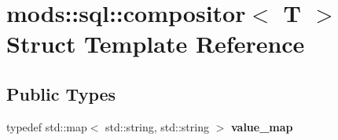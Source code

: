 \hypertarget{structmods_1_1sql_1_1compositor}{}\section{mods\+:\+:sql\+:\+:compositor$<$ T $>$ Struct Template Reference}
\label{structmods_1_1sql_1_1compositor}
\subsection*{Public Types}
\begin{DoxyCompactItemize}
\item 
\mbox{\label{structmods_1_1sql_1_1compositor_a8564c22cf6082b1480546369ba2dca76}} 
typedef std\+::map$<$ std\+::string, std\+::string $>$ {\bfseries value\+\_\+map}
\end{DoxyCompactItemize}
